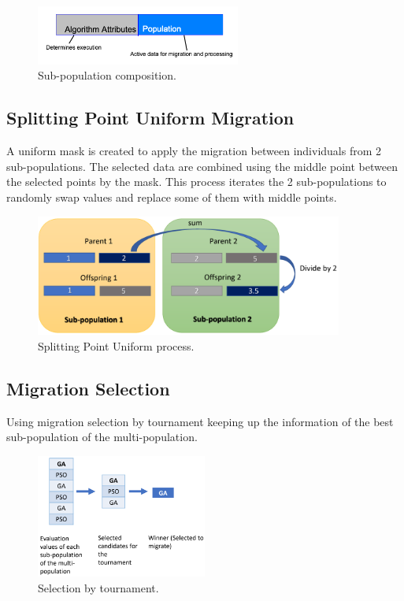 \documentclass[runningheads]{llncs}
\begin{document}
\begin{figure}[htp]
  \centering
  \includegraphics[width=0.6\textwidth]{img/subpopulationDefinition.png}
  \caption{Sub-population composition.} \label{fig1}
  \end{figure}

\subsection{Splitting Point Uniform Migration}
A uniform mask is created to apply the migration between individuals from 2
sub-populations. The selected data are combined using the middle point between
the selected points by the mask. This process iterates the 2 sub-populations to
randomly swap values and replace some of them with middle points.


\begin{figure}[htp]
  \centering
  \includegraphics[width=0.9\textwidth]{img/splittinPointUniform.png}
  \caption{Splitting Point Uniform process.} \label{fig1}
  \end{figure}

  \subsection{Migration Selection}

  Using migration selection by tournament keeping up the information of the best
  sub-population of the multi-population.

\begin{figure}[htp]
  \centering
  \includegraphics[width=0.5\textwidth]{img/selection.png}
  \caption{Selection by tournament.} \label{fig1}
  \end{figure}
\end{document}
